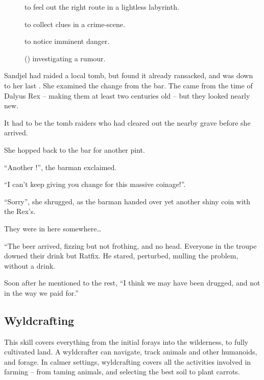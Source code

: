 \begin{multicols}{2}
\begin{description}
  \item[]
    to feel out the right route in a lightless labyrinth.
  \item[]
    to collect clues in a crime-scene.
  \item[]
    to notice imminent danger.
  \item[] (\tn[14])
    investigating a rumour.
\end{description}

\ifodd\value{r4}
\begin{exampletext}
  Sandjel had raided a local tomb, but found it already ransacked, and was down to her last .
  She examined the change from the bar.
  The  came from the time of Dalyus Rex -- making them at least two centuries old -- but they looked nearly new.

  It had to be the tomb raiders who had cleared out the nearby grave before she arrived.

  She hopped back to the bar for another pint.

  ``Another !'',
  the barman exclaimed.

  ``I can't keep giving you change for this massive coinage!''.

  ``Sorry'',
  she shrugged, as the barman handed over yet another shiny coin with the Rex's.

  They were in here somewhere\ldots

\end{exampletext}

\else

\begin{exampletext}
  ``The beer arrived, fizzing but not frothing, and no head.
  Everyone in the troupe downed their drink but Ratfix.
  He stared, perturbed, mulling the problem, without a drink.

  Soon after he mentioned to the rest,
  ``I think we may have been drugged, and not in the way we paid for.''
\end{exampletext}
\fi

\subsection{Wyldcrafting}

This skill covers everything from the initial forays into the wilderness, to fully cultivated land.
A wyldcrafter can navigate, track animals and other humanoids, and forage.
In calmer settings, wyldcrafting covers all the activities involved in farming -- from taming animals, and selecting the best soil to plant carrots.



\end{multicols}
